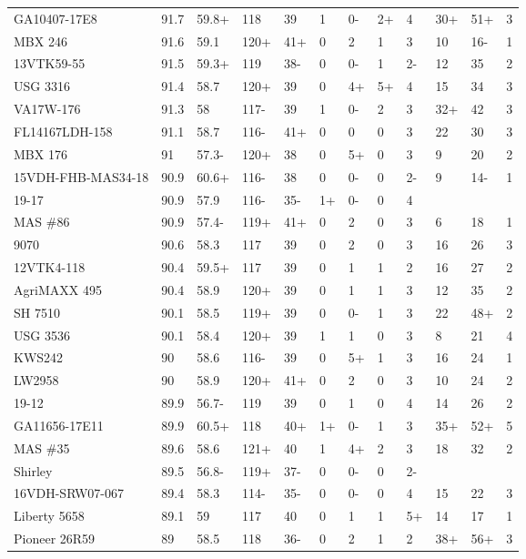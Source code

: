 \documentclass[12pt, letterpaper]{article}
\begin{document}
\begin{landscape}
\begin{ThreePartTable}
\begin{longtable}{llllllllllll}
  GA10407-17E8 & 91.7 & 59.8+ & 118 & 39 & 1 & 0- & 2+ & 4 & 30+ & 51+ & 3 \\ 
  MBX 246 & 91.6 & 59.1 & 120+ & 41+ & 0 & 2 & 1 & 3 & 10 & 16- & 1 \\ 
  13VTK59-55 & 91.5 & 59.3+ & 119 & 38- & 0 & 0- & 1 & 2- & 12 & 35 & 2 \\ 
  USG 3316 & 91.4 & 58.7 & 120+ & 39 & 0 & 4+ & 5+ & 4 & 15 & 34 & 3 \\ 
  VA17W-176 & 91.3 & 58 & 117- & 39 & 1 & 0- & 2 & 3 & 32+ & 42 & 3 \\ 
  FL14167LDH-158 & 91.1 & 58.7 & 116- & 41+ & 0 & 0 & 0 & 3 & 22 & 30 & 3 \\ 
  MBX 176 & 91 & 57.3- & 120+ & 38 & 0 & 5+ & 0 & 3 & 9 & 20 & 2 \\ 
  15VDH-FHB-MAS34-18 & 90.9 & 60.6+ & 116- & 38 & 0 & 0- & 0 & 2- & 9 & 14- & 1 \\ 
  19-17 & 90.9 & 57.9 & 116- & 35- & 1+ & 0- & 0 & 4 &  &  &  \\ 
  MAS \#86 & 90.9 & 57.4- & 119+ & 41+ & 0 & 2 & 0 & 3 & 6 & 18 & 1 \\ 
  9070 & 90.6 & 58.3 & 117 & 39 & 0 & 2 & 0 & 3 & 16 & 26 & 3 \\ 
  12VTK4-118 & 90.4 & 59.5+ & 117 & 39 & 0 & 1 & 1 & 2 & 16 & 27 & 2 \\ 
  AgriMAXX 495 & 90.4 & 58.9 & 120+ & 39 & 0 & 1 & 1 & 3 & 12 & 35 & 2 \\ 
  SH 7510 & 90.1 & 58.5 & 119+ & 39 & 0 & 0- & 1 & 3 & 22 & 48+ & 2 \\ 
  USG 3536 & 90.1 & 58.4 & 120+ & 39 & 1 & 1 & 0 & 3 & 8 & 21 & 4 \\ 
  KWS242 & 90 & 58.6 & 116- & 39 & 0 & 5+ & 1 & 3 & 16 & 24 & 1 \\ 
  LW2958 & 90 & 58.9 & 120+ & 41+ & 0 & 2 & 0 & 3 & 10 & 24 & 2 \\ 
  19-12 & 89.9 & 56.7- & 119 & 39 & 0 & 1 & 0 & 4 & 14 & 26 & 2 \\ 
  GA11656-17E11 & 89.9 & 60.5+ & 118 & 40+ & 1+ & 0- & 1 & 3 & 35+ & 52+ & 5 \\ 
  MAS \#35 & 89.6 & 58.6 & 121+ & 40 & 1 & 4+ & 2 & 3 & 18 & 32 & 2 \\ 
  Shirley & 89.5 & 56.8- & 119+ & 37- & 0 & 0- & 0 & 2- &  &  &  \\ 
  16VDH-SRW07-067 & 89.4 & 58.3 & 114- & 35- & 0 & 0- & 0 & 4 & 15 & 22 & 3 \\ 
  Liberty 5658 & 89.1 & 59 & 117 & 40 & 0 & 1 & 1 & 5+ & 14 & 17 & 1 \\ 
  Pioneer 26R59 & 89 & 58.5 & 118 & 36- & 0 & 2 & 1 & 2 & 38+ & 56+ & 3 \\ 

\end{longtable}
\end{ThreePartTable}
\end{landscape}
\end{document}
